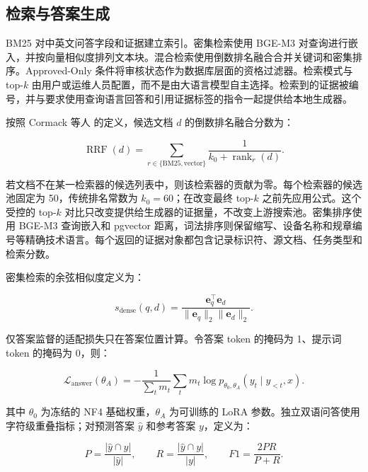 \subsection{检索与答案生成}

BM25 对中英文问答字段和证据建立索引。密集检索使用 BGE-M3 对查询进行嵌入，并按向量相似度排列文本块。混合检索使用倒数排名融合合并关键词和密集排序。Approved-Only 条件将审核状态作为数据库层面的资格过滤器。检索模式与 top-$k$ 由用户或运维人员配置，而不是由大语言模型自主选择。检索到的证据被编号，并与要求使用查询语言回答和引用证据标签的指令一起提供给本地生成器。

\begin{samepage}
按照 Cormack 等人 \citep{cormack2009rrf} 的定义，候选文档 $d$ 的倒数排名融合分数为：

\begin{equation}
\operatorname{RRF}(d)=\sum_{r \in \{\mathrm{BM25},\mathrm{vector}\}}\frac{1}{k_0+\operatorname{rank}_r(d)}.
\end{equation}
\end{samepage}

若文档不在某一检索器的候选列表中，则该检索器的贡献为零。每个检索器的候选池固定为 50，传统排名常数为 $k_0=60$；在改变最终 top-$k$ 之前先应用公式。这个受控的 top-$k$ 对比只改变提供给生成器的证据量，不改变上游搜索池。密集排序使用 BGE-M3 查询嵌入和 pgvector 距离，词法排序则保留缩写、设备名称和规章编号等精确技术语言。每个返回的证据对象都包含记录标识符、源文档、任务类型和检索分数。

密集检索的余弦相似度定义为：

\begin{equation}
s_{\mathrm{dense}}(q,d)=\frac{\mathbf{e}_q^{\top}\mathbf{e}_d}{\lVert\mathbf{e}_q\rVert_2\lVert\mathbf{e}_d\rVert_2}.
\end{equation}

仅答案监督的适配损失只在答案位置计算。令答案 token 的掩码为 1、提示词 token 的掩码为 0，则：

\begin{equation}
\mathcal{L}_{\mathrm{answer}}(\theta_A)=-\frac{1}{\sum_t m_t}\sum_t m_t\log p_{\theta_0,\theta_A}(y_t\mid y_{<t},x).
\end{equation}

其中 $\theta_0$ 为冻结的 NF4 基础权重，$\theta_A$ 为可训练的 LoRA 参数。独立双语问答使用字符级重叠指标；对预测答案 $\hat{y}$ 和参考答案 $y$，定义为：

\begin{equation}
P=\frac{|\hat{y}\cap y|}{|\hat{y}|},\qquad R=\frac{|\hat{y}\cap y|}{|y|},\qquad F1=\frac{2PR}{P+R}.
\end{equation}

